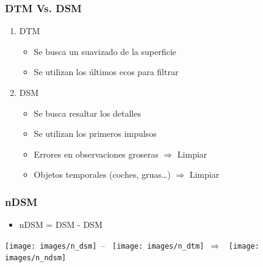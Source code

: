 \begin{frame}
  \frametitle{DTM Vs. DSM}
  \begin{enumerate}
    \item \alert{DTM}
    \begin{itemize}
      \item Se busca un suavizado de la superficie
      \item Se utilizan los últimos ecos para filtrar
    \end{itemize}
    \item \alert{DSM}
    \begin{itemize}
      \item Se busca resaltar los detalles
      \item Se utilizan los primeros impulsos
      \item Errores en observaciones groseras $\Rightarrow$ \alert{Limpiar}
      \item Objetos temporales (coches, gruas\ldots) $\Rightarrow$ \alert{Limpiar}
    \end{itemize}
  \end{enumerate}
\end{frame}
\begin{frame}
  \frametitle{nDSM}
    \begin{itemize}
      \item \alert{nDSM = DSM - DSM}
    \end{itemize}
    \begin{center}
      \texttt{[image: images/n\_dsm]}~--~
      \texttt{[image: images/n\_dtm]}~$\Rightarrow$~
      \texttt{[image: images/n\_ndsm]}~
    \end{center}
\end{frame}
